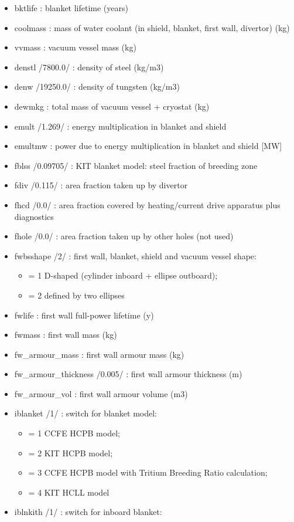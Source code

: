 \documentclass[]{article}
\providecommand{\tightlist}{%
  \setlength{\itemsep}{0pt}\setlength{\parskip}{0pt}}
\begin{document}
\begin{itemize}
\item
  bktlife : blanket lifetime (years)
\item
  coolmass : mass of water coolant (in shield, blanket, first wall,
  divertor) (kg)
\item
  vvmass : vacuum vessel mass (kg)
\item
  denstl /7800.0/ : density of steel (kg/m3)
\item
  denw /19250.0/ : density of tungsten (kg/m3)
\item
  dewmkg : total mass of vacuum vessel + cryostat (kg)
\item
  emult /1.269/ : energy multiplication in blanket and shield
\item
  emultmw : power due to energy multiplication in blanket and shield
  {[}MW{]}
\item
  fblss /0.09705/ : KIT blanket model: steel fraction of breeding zone
\item
  fdiv /0.115/ : area fraction taken up by divertor
\item
  fhcd /0.0/ : area fraction covered by heating/current drive apparatus
  plus diagnostics
\item
  fhole /0.0/ : area fraction taken up by other holes (not used)
\item
  fwbsshape /2/ : first wall, blanket, shield and vacuum vessel shape:

  \begin{itemize}
  \tightlist
  \item
    = 1 D-shaped (cylinder inboard + ellipse outboard);
  \item
    = 2 defined by two ellipses
  \end{itemize}
\item
  fwlife : first wall full-power lifetime (y)
\item
  fwmass : first wall mass (kg)
\item
  fw\_armour\_mass : first wall armour mass (kg)
\item
  fw\_armour\_thickness /0.005/ : first wall armour thickness (m)
\item
  fw\_armour\_vol : first wall armour volume (m3)
\item
  iblanket /1/ : switch for blanket model:

  \begin{itemize}
  \tightlist
  \item
    = 1 CCFE HCPB model;
  \item
    = 2 KIT HCPB model;
  \item
    = 3 CCFE HCPB model with Tritium Breeding Ratio calculation;
  \item
    = 4 KIT HCLL model
  \end{itemize}
\item
  iblnkith /1/ : switch for inboard blanket:


\end{itemize}
\end{document}

